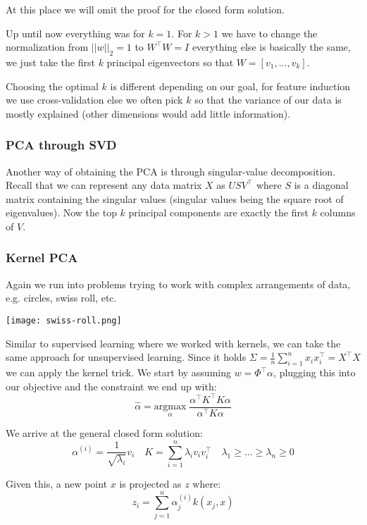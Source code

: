 At this place we will omit the proof for the closed form solution. \medskip

Up until now everything was for $k = 1$. For $k > 1$ we have to change the normalization from $||w||_2 = 1$ to $W^\top W = I$ everything else is basically the same, we just take the first $k$ principal eigenvectors so that $W = [v_1, ..., v_k]$.

Choosing the optimal $k$ is different depending on our goal, for feature induction we use cross-validation else we often pick $k$ so that the variance of our data is mostly explained (other dimensions would add little information).

\subsubsection{PCA through SVD}

Another way of obtaining the PCA is through singular-value decomposition. Recall that we can represent any data matrix $X$ as $U S V^\top$ where $S$ is a diagonal matrix containing the singular values (singular values being the square root of eigenvalues). Now the top $k$ principal components are exactly the first $k$ columns of $V$.

\subsubsection{Kernel PCA}

Again we run into problems trying to work with complex arrangements of data, e.g. circles, swiss roll, etc.

\begin{center}
	\texttt{[image: swiss-roll.png]}
\end{center}

Similar to supervised learning where we worked with kernels, we can take the same approach for unsupervised learning. Since it holds $\Sigma = \frac{1}{n} \sum_{i=1}^n x_i x_i^\top = X^\top X$ we can apply the kernel trick. We start by assuming $w = \Phi^\top \alpha$, plugging this into our objective and the constraint we end up with:
$$\hat{\alpha} = \underset{\alpha}{\text{argmax}} \; \frac{\alpha^\top K^\top K \alpha}{\alpha^\top K \alpha}$$

We arrive at the general closed form solution:
$$\alpha^{(i)} = \frac{1}{\sqrt{\lambda_i}}v_i \quad K = \sum_{i = 1}^n \lambda_i v_i v_i^\top \quad \lambda_1 \geq ... \geq \lambda_n \geq 0$$

Given this, a new point $x$ is projected as $z$ where:
$$z_i = \sum_{j=1}^n \alpha_j^{(i)} k(x_j, x)$$

